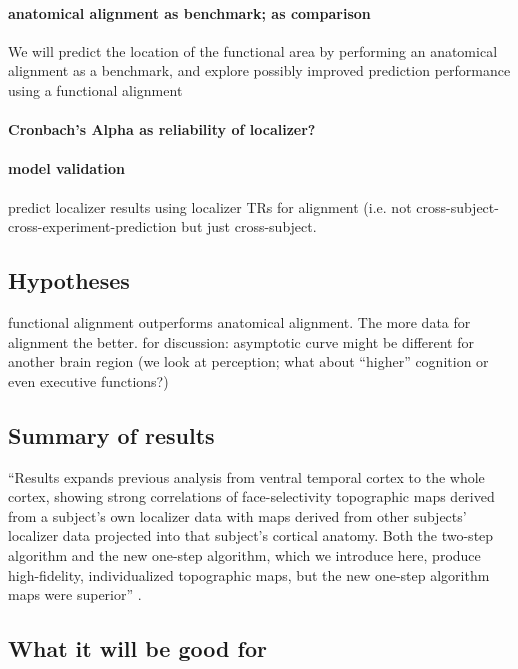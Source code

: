 \paragraph{anatomical alignment as benchmark; as comparison}

We will predict the location of the functional area by performing an
anatomical alignment as a benchmark, and explore possibly improved prediction
performance using a functional alignment

\paragraph{Cronbach's Alpha as reliability of localizer?}


\paragraph{model validation}


predict localizer results using localizer TRs for alignment (i.e. not
cross-subject-cross-experiment-prediction but just cross-subject.


\subsection{Hypotheses}
%
functional alignment outperforms anatomical alignment.
%
The more data for alignment the better.
%
for discussion: asymptotic curve might be different for another brain region
(we look at perception; what about ``higher'' cognition or even executive
functions?)


\subsection{Summary of results}
%
``Results expands previous analysis from ventral temporal cortex to the whole
cortex, showing strong correlations of face-selectivity topographic maps derived
from a subject's own localizer data with maps derived from other subjects'
localizer data projected into that subject's cortical anatomy. Both the two-step
algorithm and the new one-step algorithm, which we introduce here, produce
high-fidelity, individualized topographic maps, but the new one-step algorithm
maps were superior'' \citep{jiahui2020predicting}.


\subsection{What it will be good for}


